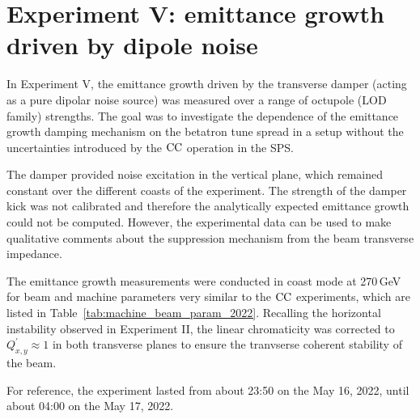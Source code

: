 \section{Experiment V: emittance growth driven by dipole noise}\label{sec:exp5_coast_md_damper_2022}

In Experiment V, the emittance growth driven by the transverse damper (acting as a pure dipolar noise source) was measured over a range of octupole (LOD family) strengths. The goal was to investigate the dependence of the emittance growth damping mechanism on the betatron tune spread in a setup without the uncertainties introduced by the ${\mathrm{CC}}$ operation in the SPS. %


The damper provided noise excitation in the vertical plane, which remained constant over the different coasts of the experiment. The strength of the damper kick was not calibrated and therefore the analytically expected emittance growth could not be computed. However, the experimental data can be used to make qualitative comments about the suppression mechanism from the beam transverse impedance.  

The emittance growth measurements were conducted in coast mode at 270\,GeV for beam and machine parameters very similar to the ${\mathrm{CC}}$ experiments, which are listed in Table~\ref{tab:machine_beam_param_2022}. Recalling the horizontal instability observed in Experiment II, the linear chromaticity was corrected to $Q^\prime_{x,y} \approx 1$ in both transverse planes to ensure the tranvserse coherent stability of the beam.


For reference, the experiment lasted from about 23:50 on the May 16, 2022, until about 04:00 on the May 17, 2022.

